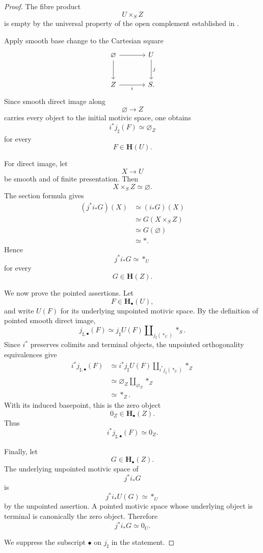 \begin{proof}
The fibre product
\[
    U\times_SZ
\]
is empty by the universal property of the open complement established
in
.

Apply smooth base change to the Cartesian square
\[
\begin{tikzcd}[column sep=large, row sep=large]
    \varnothing
        \arrow[r]
        \arrow[d]
    &
    U
        \arrow[d, "j"]
    \\
    Z
        \arrow[r, "i"']
    &
    S.
\end{tikzcd}
\]
Since smooth direct image along
\[
    \varnothing
    \longrightarrow
    Z
\]
carries every object to the initial motivic space, one obtains
\[
    i^*j_\sharp(F)
    \simeq
    \varnothing_Z
\]
for every
\[
    F
    \in
    \mathbf H(U).
\]

For direct image, let
\[
    X
    \longrightarrow
    U
\]
be smooth and of finite presentation.  Then
\[
    X\times_SZ
    \simeq
    \varnothing.
\]
The section formula gives
\[
\begin{aligned}
    (j^*i_*G)(X)
    &\simeq
    (i_*G)(X)
    \\
    &\simeq
    G(X\times_SZ)
    \\
    &\simeq
    G(\varnothing)
    \\
    &\simeq
    *.
\end{aligned}
\]
Hence
\[
    j^*i_*G
    \simeq
    *_U
\]
for every
\[
    G
    \in
    \mathbf H(Z).
\]

We now prove the pointed assertions.  Let
\[
    F
    \in
    \mathbf H_\bullet(U),
\]
and write \(U(F)\) for its underlying unpointed motivic space.  By the
definition of pointed smooth direct image,
\[
    j_{\sharp,\bullet}(F)
    \simeq
    j_\sharp U(F)
    \amalg_{j_\sharp(*_U)}
    *_S.
\]
Since \(i^*\) preserves colimits and terminal objects, the unpointed
orthogonality equivalences give
\[
\begin{aligned}
    i^*j_{\sharp,\bullet}(F)
    &\simeq
    i^*j_\sharp U(F)
    \amalg_{i^*j_\sharp(*_U)}
    *_Z
    \\
    &\simeq
    \varnothing_Z
    \amalg_{\varnothing_Z}
    *_Z
    \\
    &\simeq
    *_Z.
\end{aligned}
\]
With its induced basepoint, this is the zero object
\[
    0_Z
    \in
    \mathbf H_\bullet(Z).
\]
Thus
\[
    i^*j_{\sharp,\bullet}(F)
    \simeq
    0_Z.
\]

Finally, let
\[
    G
    \in
    \mathbf H_\bullet(Z).
\]
The underlying unpointed motivic space of
\[
    j^*i_*G
\]
is
\[
    j^*i_*U(G)
    \simeq
    *_U
\]
by the unpointed assertion.  A pointed motivic space whose underlying
object is terminal is canonically the zero object.  Therefore
\[
    j^*i_*G
    \simeq
    0_U.
\]

We suppress the subscript \(\bullet\) on \(j_\sharp\) in the
statement.
\end{proof}

